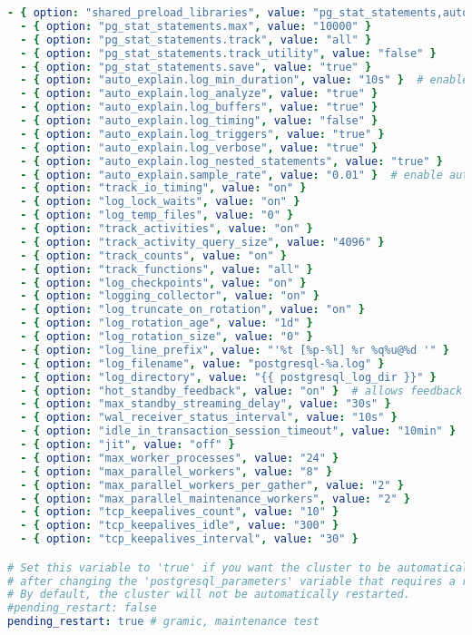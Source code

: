 \begin{flushleft}
\begin{lstlisting}[language=yaml, caption=Testsystem - Anhang - Maintenance - main.yml,captionpos=b,label={lst:testsystem-maintenance-main.yml},breaklines=true]
  - { option: "shared_preload_libraries", value: "pg_stat_statements,auto_explain" }
  - { option: "pg_stat_statements.max", value: "10000" }
  - { option: "pg_stat_statements.track", value: "all" }
  - { option: "pg_stat_statements.track_utility", value: "false" }
  - { option: "pg_stat_statements.save", value: "true" }
  - { option: "auto_explain.log_min_duration", value: "10s" }  # enable auto_explain for 10-second logging threshold. Decrease this value if necessary
  - { option: "auto_explain.log_analyze", value: "true" }
  - { option: "auto_explain.log_buffers", value: "true" }
  - { option: "auto_explain.log_timing", value: "false" }
  - { option: "auto_explain.log_triggers", value: "true" }
  - { option: "auto_explain.log_verbose", value: "true" }
  - { option: "auto_explain.log_nested_statements", value: "true" }
  - { option: "auto_explain.sample_rate", value: "0.01" }  # enable auto_explain for 1% of queries logging threshold
  - { option: "track_io_timing", value: "on" }
  - { option: "log_lock_waits", value: "on" }
  - { option: "log_temp_files", value: "0" }
  - { option: "track_activities", value: "on" }
  - { option: "track_activity_query_size", value: "4096" }
  - { option: "track_counts", value: "on" }
  - { option: "track_functions", value: "all" }
  - { option: "log_checkpoints", value: "on" }
  - { option: "logging_collector", value: "on" }
  - { option: "log_truncate_on_rotation", value: "on" }
  - { option: "log_rotation_age", value: "1d" }
  - { option: "log_rotation_size", value: "0" }
  - { option: "log_line_prefix", value: "'%t [%p-%l] %r %q%u@%d '" }
  - { option: "log_filename", value: "postgresql-%a.log" }
  - { option: "log_directory", value: "{{ postgresql_log_dir }}" }
  - { option: "hot_standby_feedback", value: "on" }  # allows feedback from a hot standby to the primary that will avoid query conflicts
  - { option: "max_standby_streaming_delay", value: "30s" }
  - { option: "wal_receiver_status_interval", value: "10s" }
  - { option: "idle_in_transaction_session_timeout", value: "10min" }  # reduce this timeout if possible
  - { option: "jit", value: "off" }
  - { option: "max_worker_processes", value: "24" }
  - { option: "max_parallel_workers", value: "8" }
  - { option: "max_parallel_workers_per_gather", value: "2" }
  - { option: "max_parallel_maintenance_workers", value: "2" }
  - { option: "tcp_keepalives_count", value: "10" }
  - { option: "tcp_keepalives_idle", value: "300" }
  - { option: "tcp_keepalives_interval", value: "30" }

# Set this variable to 'true' if you want the cluster to be automatically restarted
# after changing the 'postgresql_parameters' variable that requires a restart in the 'config_pgcluster.yml' playbook.
# By default, the cluster will not be automatically restarted.
#pending_restart: false
pending_restart: true # gramic, maintenance test


\end{lstlisting}
\end{flushleft}
